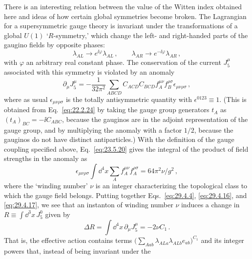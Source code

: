 There is an interesting relation between the value of the Witten index
obtained here and ideas of how certain global symmetries become broken.
The Lagrangian for a supersymmetric gauge theory is invariant under the
transformations of a global \(U(1)\) `\(R\)-symmetry,' which change the
left- and right-handed parts of the gaugino fields by opposite phases:
\begin{equation}
  \lambda_{AL}\longrightarrow e^{\ii\varphi}\lambda_{AL}\,,
  \qquad
  \lambda_{AR}\longrightarrow e^{-\ii\varphi}\lambda_{AR}\,,
  \tag{29.4.15}\label{eq:29.4.15}
\end{equation}
with \(\varphi\) an arbitrary real constant phase. The conservation of the
current \(J_5^\mu\) associated with this symmetry is violated by an anomaly
\begin{equation}
  \partial_\mu J_5^\mu
  =
  -\frac{1}{32\pi^2}
  \sum_{ABCD}
  C_{ACD}C_{BCD}
  f_A^{\mu\nu}f_B^{\rho\sigma}
  \epsilon_{\mu\nu\rho\sigma}\,,
  \tag{29.4.16}\label{eq:29.4.16}
\end{equation}
where as usual \(\epsilon_{\mu\nu\rho\sigma}\) is the totally
antisymmetric quantity with \(\epsilon^{0123}\equiv1\). (This is obtained
from Eq.~\eqref{eq:22.2.24} by taking the gauge group generators \(t_A\) as
\((t_A)_{BC}=-\ii C_{ABC}\), because the gauginos are in the adjoint
representation of the gauge group, and by multiplying the anomaly with a
factor \(1/2\), because the gauginos do not have distinct antiparticles.)
With the definition of the gauge coupling specified above,
Eq.~\eqref{eq:23.5.20} gives the integral of the product of field strengths
in the anomaly as
\begin{equation}
  \epsilon_{\mu\nu\rho\sigma}
  \int \dd^4x\sum_A f_A^{\mu\nu}f_A^{\rho\sigma}
  =64\pi^2\nu/g^2\,,
  \tag{29.4.17}\label{eq:29.4.17}
\end{equation}
where the `winding number' \(\nu\) is an integer characterizing the
topological class to which the gauge field belongs. Putting together
Eqs.~\eqref{eq:29.4.4}, \eqref{eq:29.4.16}, and \eqref{eq:29.4.17}, we
see that an instanton of winding number \(\nu\) induces a change in
\(R\equiv\int \dd^3x\,J_5^0\) given by
\begin{equation}
  \Delta R
  =
  \int \dd^4x\,\partial_\mu J_5^\mu
  =-2\nu C_1\,.
  \tag{29.4.18}\label{eq:29.4.18}
\end{equation}
That is, the effective action contains terms
\(\bigl(\sum_{Aab}\lambda_{ALa}\lambda_{ALb}e_{ab}\bigr)^{C_1}\) and
its integer powers that, instead of being invariant under the
